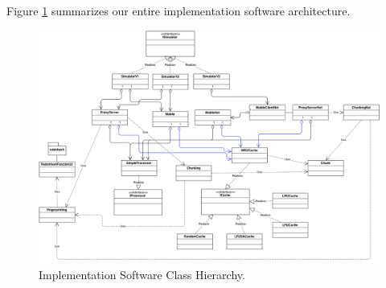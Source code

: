 Figure \ref{fig:class_diagram} summarizes our entire implementation software architecture.

\begin{figure}[ht] 
\centering \includegraphics[scale=0.40]{images/class_diagram.png}
\caption{Implementation Software Class Hierarchy.}
\label{fig:class_diagram}
\end{figure}





